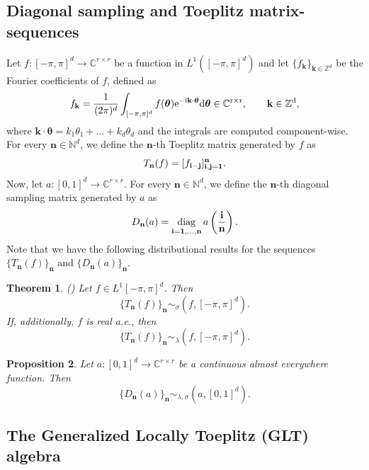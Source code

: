 \documentclass{amsart}
\newtheorem{thm}{Theorem}[section]
\newtheorem{prop}[thm]{Proposition}
\newcommand{\diag}{\mathop{\mathrm{diag}}}\newcommand{\esssup}{\mathop{\mathrm{ess\,sup}}}\newcommand{\essinf}{\mathop{\mathrm{ess\,inf}}}\newcommand{\e}{\textup{e}}\renewcommand{\i}{\textup{i}}\newcommand{\bfa}{\mathbf a}\newcommand{\bfb}{\mathbf b}\newcommand{\bfc}{\mathbf c}\newcommand{\bfd}{\mathbf d}\newcommand{\bfe}{\mathbf e}\newcommand{\bff}{\mathbf f}\newcommand{\bfg}{\mathbf g}\newcommand{\bfh}{\mathbf h}\newcommand{\bfi}{\mathbf i}\newcommand{\bfj}{\mathbf j}\newcommand{\bfk}{\mathbf k}\newcommand{\bfl}{\mathbf l}\newcommand{\bfm}{\mathbf m}\newcommand{\bfn}{\mathbf n}\newcommand{\bfo}{\mathbf o}\newcommand{\bfp}{\mathbf p}\newcommand{\bfq}{\mathbf q}\newcommand{\bfr}{\mathbf r}\newcommand{\bfs}{\mathbf s}\newcommand{\bft}{\mathbf t}\newcommand{\bfu}{\mathbf u}\newcommand{\bfw}{\mathbf w}\newcommand{\bfv}{\mathbf v}\newcommand{\bfx}{\mathbf x}\newcommand{\bfy}{\mathbf y}\newcommand{\bfz}{\mathbf z}\newcommand{\bfzero}{\mathbf 0}\newcommand{\bfuno}{\mathbf 1}
\newcommand{\bftheta}{{\boldsymbol\theta}}
\begin{document}
\subsection{Diagonal sampling and Toeplitz matrix-sequences}
Let $f:[-\pi,\pi]^d \to \mathbb{C}^{r \times r}$ be a function in $L^1([-\pi,\pi]^d)$ and let $\{f_{\bfk}\}_{\bfk \in \mathbb{Z}^d}$ be the Fourier coefficients of $f$, defined as
\begin{equation*}
    f_{\bfk} = \frac{1}{(2 \pi)^d} \int_{[-\pi,\pi]^d} f(\bftheta) \rm{e}^{-i \bfk \cdot \bftheta}  \rm{d}\bftheta \in \mathbb{C}^{r \times r}, \qquad \bfk \in \mathbb{Z}^d,
\end{equation*}
where $\bfk \cdot \bftheta = k_1 \theta_1 + \dots + k_d \theta_d $ and the integrals are computed component-wise. For every $\bfn \in \mathbb{N}^d$, we define the $\bfn$-th Toeplitz matrix generated by $f$ as
\begin{equation*}
    T_{\bfn}(f) = [f_{\bfi-\bfj}]_{\bfi,\bfj=\bf1}^{\bfn}.
\end{equation*}
Now, let $a: [0,1]^d \to \mathbb{C}^{r \times r}$. For every $\bfn \in \mathbb{N}^d$, we define the $\bfn$-th diagonal sampling matrix generated by $a$ as
\begin{equation*}
    D_{\bfn}(a) =\diag_{\bfi=\bf1,\dots,\bfn} a \left( \frac{\bfi}{\bfn} \right).
\end{equation*}
Note that we have the following distributional results for the sequences $\{T_\bfn(f)\}_{\bfn}$ and $\{D_\bfn(a)\}_\bfn$.
\begin{thm}\rm{(\cite{Tillinota})}
    Let $f \in L^1[-\pi,\pi]^d$. Then
    \begin{equation*}
        \{T_\bfn(f)\}_\bfn \sim_{\sigma} (f,[-\pi,\pi]^d).
    \end{equation*}
If, additionally, $f$ is real a.e., then
\begin{equation*}
    \{T_{\bfn}(f)\}_{\bfn} \sim_{\lambda} (f,[-\pi,\pi]^d).
\end{equation*}
\end{thm}
\begin{prop}
Let $a:[0,1]^d \to \mathbb{C}^{r \times r}$ be a continuous almost everywhere function. Then
\begin{equation*}
    \{D_{\bfn}(a)\}_{\bfn} \sim_{\lambda,\sigma} (a,[0,1]^d).
\end{equation*}
\end{prop}

\subsection{The Generalized Locally Toeplitz (GLT) algebra}
\end{document}
